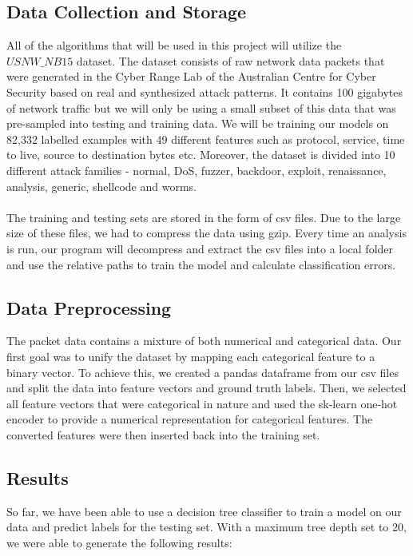 \documentclass[
11pt, %
letterpaper, %
oneside, %
headinclude,footinclude, %
BCOR5mm, %
]{scrartcl}
\begin{document}
\subsection{Data Collection and Storage}
All of the algorithms that will be used in this project will utilize the $USNW\_NB15$ dataset. The dataset consists of raw network data packets that were generated in the Cyber Range Lab of the Australian Centre for Cyber Security based on real and synthesized attack patterns. It contains 100 gigabytes of network traffic but we will only be using a small subset of this data that was pre-sampled into testing and training data. We will be training our models on 82,332 labelled examples with 49 different features such as protocol, service, time to live, source to destination bytes etc. Moreover, the dataset is divided into 10 different attack families - normal, DoS, fuzzer, backdoor, exploit, renaissance, analysis, generic, shellcode and worms.\\\\ 
The training and testing sets are stored in the form of csv files. Due to the large size of these files, we had to compress the data using gzip. Every time an analysis is run, our program will decompress and extract the csv files into a local folder and use the relative paths to train the model and calculate classification errors.

\subsection{Data Preprocessing}
The packet data contains a mixture of both numerical and categorical data. Our first goal was to unify the dataset by mapping each categorical feature to a binary vector. To achieve this, we created a pandas dataframe from our csv files and split the data into feature vectors and ground truth labels. Then, we selected all feature vectors that were categorical in nature and used the sk-learn one-hot encoder to provide a numerical representation for categorical features. The converted features were then inserted back into the training set.

\subsection{Results}
So far, we have been able to use a decision tree classifier to train a model on our data and predict labels for the testing set. With a maximum tree depth set to 20, we were able to generate the following results: 
\end{document}
